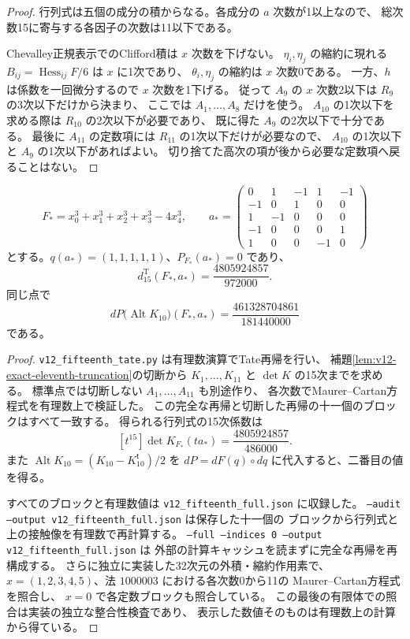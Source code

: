 \begin{proof}
行列式は五個の成分の積からなる。各成分の $a$ 次数が1以上なので、
総次数15に寄与する各因子の次数は11以下である。

Chevalley正規表示でのClifford積は $x$ 次数を下げない。
$\eta_i,\eta_j$ の縮約に現れる
$B_{ij}=\operatorname{Hess}_{ij}F/6$ は $x$ に1次であり、
$\theta_i,\eta_j$ の縮約は $x$ 次数0である。
一方、$h$ は係数を一回微分するので $x$ 次数を1下げる。
従って $A_9$ の $x$ 次数2以下は $R_9$ の3次以下だけから決まり、
ここでは $A_1,\ldots,A_8$ だけを使う。
$A_{10}$ の1次以下を求める際は $R_{10}$ の2次以下が必要であり、
既に得た $A_9$ の2次以下で十分である。
最後に $A_{11}$ の定数項には $R_{11}$ の1次以下だけが必要なので、
$A_{10}$ の1次以下と $A_9$ の1次以下があればよい。
切り捨てた高次の項が後から必要な定数項へ戻ることはない。
\end{proof}

\begin{proposition}[標準点での未正規化十五次係数]
\label{prop:v12-actual-fifteenth-value}
\[
 F_*=x_0^3+x_1^3+x_2^3+x_3^3-4x_4^3,\qquad
 a_*=
 \begin{pmatrix}
 0&1&-1&1&-1\\
 -1&0&1&0&0\\
 1&-1&0&0&0\\
 -1&0&0&0&1\\
 1&0&0&-1&0
 \end{pmatrix}
\]
とする。$q(a_*)=(1,1,1,1,1)$、$P_{F_*}(a_*)=0$ であり、
\[
 \boxed{\displaystyle
 d^{\mathrm T}_{15}(F_*,a_*)=
 \frac{4805924857}{972000}.}
\]
同じ点で
\[
 dP\bigl(\operatorname{Alt}K_{10}\bigr)(F_*,a_*)
 =\frac{461328704861}{181440000}
\]
である。
\end{proposition}

\begin{proof}
\texttt{v12\_fifteenth\_tate.py} は有理数演算でTate再帰を行い、
補題\ref{lem:v12-exact-eleventh-truncation}の切断から
$K_1,\ldots,K_{11}$ と $\det K$ の15次までを求める。
標準点では切断しない $A_1,\ldots,A_{11}$ も別途作り、
各次数でMaurer--Cartan方程式を有理数上で検証した。
この完全な再帰と切断した再帰の十一個のブロックはすべて一致する。
得られる行列式の15次係数は
\[
 [t^{15}]\det K_{F_*}(ta_*)=\frac{4805924857}{486000}.
\]
また $\operatorname{Alt}K_{10}=(K_{10}-K_{10}^{\mathsf t})/2$ を
$dP=dF(q)\circ dq$ に代入すると、二番目の値を得る。

すべてのブロックと有理数値は
\texttt{v12\_fifteenth\_full.json} に収録した。
\texttt{--audit --output v12\_fifteenth\_full.json} は保存した十一個の
ブロックから行列式と上の接触像を有理数で再計算する。
\texttt{--full --indices 0 --output v12\_fifteenth\_full.json} は
外部の計算キャッシュを読まずに完全な再帰を再構成する。
さらに独立に実装した32次元の外積・縮約作用素で、
$x=(1,2,3,4,5)$、法 $1000003$ における各次数0から11の
Maurer--Cartan方程式を照合し、
$x=0$ で各定数ブロックも照合している。
この最後の有限体での照合は実装の独立な整合性検査であり、
表示した数値そのものは有理数上の計算から得ている。
\end{proof}

